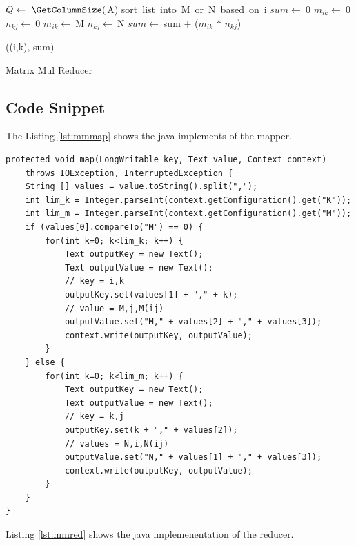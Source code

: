 \documentclass{article}
\begin{document}
\IncMargin{1em}
\begin{algorithm}[H]
\DontPrintSemicolon
{}
\BlankLine
$Q\leftarrow\ \GetColumnSize($A)\;
sort\ list\ into\ M\ or\ N\ based\ on\ i\;
$sum\leftarrow\ $0\;
 {
	$m_{ik}\leftarrow\ $0\;
	$n_{kj}\leftarrow\ $0\;
	 {
		$m_{ik}\leftarrow\ $M\big[K\big]
	}
	 {
		$n_{kj}\leftarrow\ $N\big[K\big]
	}
	$sum\leftarrow\ $sum $+$ ($m_{ik}$ $*$ $n_{kj}$)
}

\emit((i,k), sum)

\caption{Matrix Mul Reducer\label{IR}}
\end{algorithm}
\DecMargin{1em}

\subsection{Code Snippet}

The Listing \ref{lst:mmmap} shows the java implements of the mapper.

\begin{lstlisting}[caption={Matrix multiplication mapper code snippet},label={lst:mmmap},style=MyJavaStyle]
protected void map(LongWritable key, Text value, Context context)
	throws IOException, InterruptedException {
	String [] values = value.toString().split(",");
	int lim_k = Integer.parseInt(context.getConfiguration().get("K"));
	int lim_m = Integer.parseInt(context.getConfiguration().get("M"));
	if (values[0].compareTo("M") == 0) {
		for(int k=0; k<lim_k; k++) {
			Text outputKey = new Text();
			Text outputValue = new Text();
			// key = i,k
			outputKey.set(values[1] + "," + k);
			// value = M,j,M(ij)
			outputValue.set("M," + values[2] + "," + values[3]);
			context.write(outputKey, outputValue);
		}
	} else {
		for(int k=0; k<lim_m; k++) {
			Text outputKey = new Text();
			Text outputValue = new Text();
			// key = k,j
			outputKey.set(k + "," + values[2]);
			// values = N,i,N(ij)
			outputValue.set("N," + values[1] + "," + values[3]);
			context.write(outputKey, outputValue);
		}
	}
}
\end{lstlisting}

Listing \ref{lst:mmred} shows the java implemenentation of the reducer.
\end{document}
